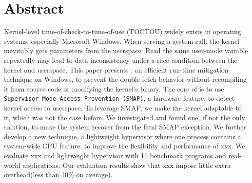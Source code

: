 \section{Abstract}


Kernel-level time-of-check-to-time-of-use (TOCTOU) widely exists in operating systems, especially Microsoft Windows. When serving a system call, the kernel inevitably gets parameters from the userspace. Read the same user-mode variable repeatedly may lead to data inconsistency under a race condition between the kernel and userspace. This paper presents \name, an efficient run-time mitigation technique on Windows, to prevent the double fetch behavior without recompiling it from source code or modifying the kernel's binary. The core of \name is to use \texttt{Supervisor Mode Access Prevention (SMAP)}, a hardware feature, to detect kernel access to userspace. To leverage SMAP, we make the kernel adaptable to it, which was not the case before. We investigated and found one, if not the only solution, to make the system recover from the fatal SMAP exception.
We further develop a new technique, a lightweight hypervisor where one process contains a system-wide CPU feature, to improve the flexibility and performance of xxx. We evaluate xxx and lightweight hypervisor with 11  benchmark programs and real-world applications. Our evaluation results show that xxx impose little extra overhead(less than 10\% on average).
